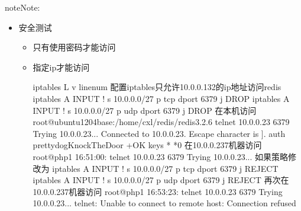 \documentclass[a4paper,10pt,english]{sphinxmanual}
\begin{document}
\begin{sphinxadmonition}{note}{Note:}
\end{sphinxadmonition}
\begin{itemize}
\item {} 
安全测试
\begin{itemize}
\item {} 
只有使用密码才能访问

\begin{sphinxVerbatim}[commandchars=\\\{\}]
 
        
 
  
   \PYG{l+s+s1}{\PYGZca{}]}
 
 
\end{sphinxVerbatim}

\item {} 
指定ip才能访问

\begin{sphinxVerbatim}[commandchars=\\\{\}]
iptables \PYGZhy{}L \PYGZhy{}v \PYGZhy{}\PYGZhy{}line\PYGZhy{}num
配置iptables只允许10.0.0.1\PYGZhy{}32的ip地址访问redis
iptables \PYGZhy{}A INPUT ! \PYGZhy{}s 10.0.0.0/27 \PYGZhy{}p tcp \PYGZhy{}\PYGZhy{}dport 6379 \PYGZhy{}j DROP
iptables \PYGZhy{}A INPUT ! \PYGZhy{}s 10.0.0.0/27 \PYGZhy{}p udp \PYGZhy{}\PYGZhy{}dport 6379 \PYGZhy{}j DROP
在本机访问
root@ubuntu1204base:/home/cxl/redis/redis\PYGZhy{}3.2.6\PYGZsh{} telnet 10.0.0.23 6379
Trying 10.0.0.23...
Connected to 10.0.0.23.
Escape character is \PYGZsq{}\PYGZca{}]\PYGZsq{}.
auth prettydogKnockTheDoor
+OK
keys *
*0
在10.0.0.237机器访问
root@php1 16:51:00:\PYGZti{}\PYGZsh{} telnet 10.0.0.23 6379
Trying 10.0.0.23...
如果策略修改为
iptables \PYGZhy{}A INPUT ! \PYGZhy{}s 10.0.0.0/27 \PYGZhy{}p tcp \PYGZhy{}\PYGZhy{}dport 6379 \PYGZhy{}j REJECT
iptables \PYGZhy{}A INPUT ! \PYGZhy{}s 10.0.0.0/27 \PYGZhy{}p udp \PYGZhy{}\PYGZhy{}dport 6379 \PYGZhy{}j REJECT
再次在10.0.0.237机器访问
root@php1 16:53:23:\PYGZti{}\PYGZsh{} telnet 10.0.0.23 6379
Trying 10.0.0.23...
telnet: Unable to connect to remote host: Connection refused
\end{sphinxVerbatim}


\end{itemize}
\end{itemize}
\end{document}
